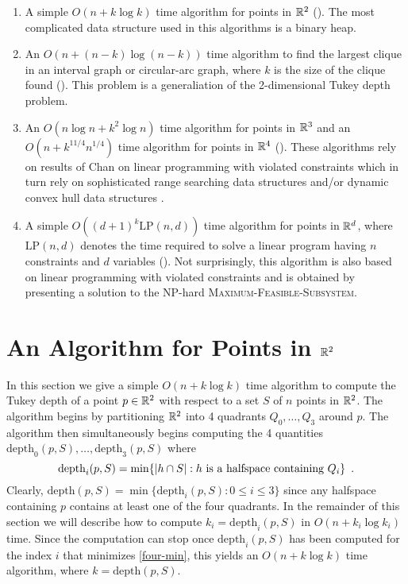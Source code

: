 \documentclass[charterfonts,lotsofwhite]{patmorin}
\newcommand{\td}{\mathrm{depth}}
\newcommand{\lp}{\mathrm{LP}}
\begin{document}
\begin{enumerate}
\item A simple $O(n + k\log k)$ time algorithm for points in $\mathbb{R}^2$
().  The most complicated data structure used in this
algorithms is a binary heap.

\item An $O(n + (n-k)\log(n-k))$ time algorithm to find the largest
clique in an interval graph or circular-arc graph, where $k$ is the
size of the clique found ().  This problem is
a generaliation of the 2-dimensional Tukey depth problem.

\item An $O(n\log n + k^2\log n)$ time algorithm for points in $\mathbb{R}^3$
and an $O(n + k^{11/4}n^{1/4})$ time algorithm for points in $\mathbb{R}^4$
().  These algorithms rely on results of Chan on linear
programming with violated constraints \cite{X} which in turn rely on
sophisticated range searching data structures \cite{X} and/or dynamic
convex hull data structures \cite{X}.

\item A simple $O((d+1)^k \lp(n,d))$ time algorithm for points in
$\mathbb{R}^d$, where $\lp(n,d)$ denotes the time required to solve a linear
program having $n$ constraints and $d$ variables ().
Not surprisingly, this algorithm is also based on linear programming
with violated constraints and is obtained by presenting a solution to
the NP-hard \textsc{Maximum-Feasible-Subsystem}.
\end{enumerate}


\section{An Algorithm for Points in $\mathbb{R}^2$}

In this section we give a simple $O(n + k\log k)$ time algorithm to
compute the Tukey depth of a point $p\in\mathbb{R}^2$ with respect to
a set $S$ of $n$ points in $\mathbb{R}^2$.  The algorithm begins by
partitioning $\mathbb{R}^2$ into 4 quadrants $Q_0,\ldots,Q_3$ around $p$.
The algorithm then simultaneously begins computing the 4 quantities
$\td_0(p,S),\ldots,\td_3(p,S)$ where 
\begin{equation}
     \td_i(p,S) = \min\{|h\cap S| : \mbox{$h$ is a halfspace containing
$Q_i$} \} \enspace . \eqlabel{four-min}
\end{equation}
Clearly, $\td(p,S) = \min\{\td_i(p,S): 0\le i \le 3 \}$ since any
halfspace containing $p$ contains at least one of the four quadrants.
In the remainder of this section we will describe how to compute
$k_i=\td_i(p,S)$ in $O(n + k_i\log k_i)$ time.  Since the
computation can stop once $\td_i(p,S)$ has been computed for
the index $i$ that minimizes \eqref{four-min}, this yields an $O(n +
k\log k)$ time algorithm, where $k=\td(p,S)$.
\end{document}

